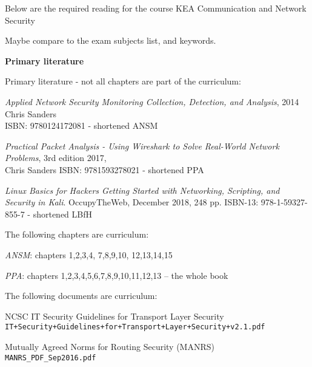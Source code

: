 \documentclass[a4paper,11pt,notitlepage,landscape]{report}
\begin{document}
{}


\normal

Below are the required reading for the course KEA Communication and Network Security \the\year

Maybe compare to the exam subjects list, and keywords.


{\bf Primary literature}

Primary literature - not all chapters are part of the curriculum:
\begin{list2}
\item \emph{Applied Network Security Monitoring Collection, Detection, and Analysis}, 2014 Chris Sanders \\
ISBN: 9780124172081 - shortened ANSM
\item \emph{Practical Packet Analysis - Using Wireshark to Solve Real-World Network Problems}, 3rd edition 2017, \\
Chris Sanders ISBN: 9781593278021 - shortened PPA
\item \emph{Linux Basics for Hackers Getting Started with Networking, Scripting, and Security in Kali}. OccupyTheWeb, December 2018, 248 pp. ISBN-13: 978-1-59327-855-7 - shortened LBfH
\end{list2}


The following chapters are curriculum:

\begin{list2}
\item \emph{ANSM}: chapters 1,2,3,4, 7,8,9,10, 12,13,14,15
\item \emph{PPA}: chapters 1,2,3,4,5,6,7,8,9,10,11,12,13 -- the whole book

\end{list2}

The following documents are curriculum:
\begin{list2}
\item NCSC IT Security Guidelines for Transport Layer Security\\
\verb_IT+Security+Guidelines+for+Transport+Layer+Security+v2.1.pdf_
\item Mutually Agreed Norms for Routing Security (MANRS)\\
\verb+MANRS_PDF_Sep2016.pdf+
\end{list2}
\end{document}
